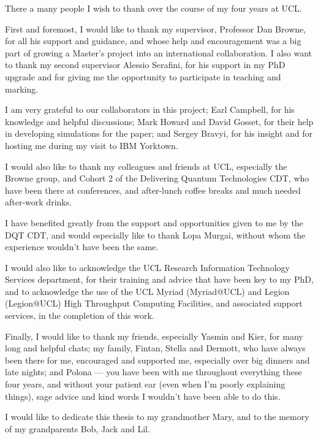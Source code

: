 \begin{acknowledgements}
There a many people I wish to thank over the course of my four years at UCL.\par
First and foremost, I would like to thank my supervisor, Professor Dan Browne, for all his support and guidance, and whose help and encouragement was a big part of growing a Master's project into an international collaboration. I also want to thank my second supervisor Alessio Serafini, for his support in my PhD upgrade and for giving me the opportunity to participate in teaching and marking.\par
I am very grateful to our collaborators in this project; Earl Campbell, for his knowledge and helpful discussions; Mark Howard and David Gosset, for their help in developing simulations for the paper; and Sergey Bravyi, for his insight and for hosting me during my visit to IBM Yorktown.\par
I would also like to thank my colleagues and friends at UCL, especially the Browne group, and Cohort 2 of the Delivering Quantum Technologies CDT, who have been there at conferences, and after-lunch coffee breaks and much needed after-work drinks.\par
I have benefited greatly from the support and opportunities given to me by the DQT CDT, and would especially like to thank Lopa Murgai, without whom the experience wouldn't have been the same.\par
I would also like to acknowledge the UCL Research Information Technology Services department, for their training and advice that have been key to my PhD, and to acknowledge the use of the UCL Myriad (Myriad@UCL) and Legion (Legion@UCL) High Throughput Computing Facilities, and associated support services, in the completion of this work.\par
Finally, I would like to thank my friends, especially Yasmin and Kier, for many long and helpful chats; my family, Fintan, Stella and Dermott, who have always been there for me, encouraged and supported me, especially over big dinners and late nights; and Polona --- you have been with me throughout everything these four years, and without your patient ear (even when I’m poorly explaining things), sage advice and kind words I wouldn't have been able to do this.\par
I would like to dedicate this thesis to my grandmother Mary, and to the memory of my grandparents Bob, Jack and Lil.
\end{acknowledgements}

\setcounter{tocdepth}{2} 

\tableofcontents

\printnomenclature


